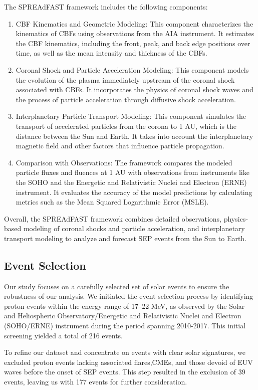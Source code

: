 The SPREAdFAST framework includes the following components:
\begin{enumerate}
    \item CBF Kinematics and Geometric Modeling: This component characterizes the kinematics of CBFs using observations from the AIA instrument. It estimates the CBF kinematics, including the front, peak, and back edge positions over time, as well as the mean intensity and thickness of the CBFs.
    \item Coronal Shock and Particle Acceleration Modeling: This component models the evolution of the plasma immediately upstream of the coronal shock associated with CBFs. It incorporates the physics of coronal shock waves and the process of particle acceleration through diffusive shock acceleration.
    \item Interplanetary Particle Transport Modeling: This component simulates the transport of accelerated particles from the corona to 1 AU, which is the distance between the Sun and Earth. It takes into account the interplanetary magnetic field and other factors that influence particle propagation.
    \item Comparison with Observations: The framework compares the modeled particle fluxes and fluences at 1 AU with observations from instruments like the SOHO and the Energetic and Relativistic Nuclei and Electron (ERNE) instrument. It evaluates the accuracy of the model predictions by calculating metrics such as the Mean Squared Logarithmic Error (MSLE).
\end{enumerate}
Overall, the SPREAdFAST framework combines detailed observations, physics-based modeling of coronal shocks and particle acceleration, and interplanetary transport modeling to analyze and forecast SEP events from the Sun to Earth.

\subsection{Event Selection}
Our study focuses on a carefully selected set of solar events to ensure the robustness of our analysis. We initiated the event selection process by identifying proton events within the energy range of 17–22 MeV, as observed by the Solar and Heliospheric Observatory/Energetic and Relativistic Nuclei and Electron (SOHO/ERNE) instrument during the period spanning 2010-2017. This initial screening yielded a total of 216 events.

To refine our dataset and concentrate on events with clear solar signatures, we excluded proton events lacking associated flares,CMEs, and those devoid of EUV waves before the onset of SEP events. This step resulted in the exclusion of 39 events, leaving us with 177 events for further consideration.

